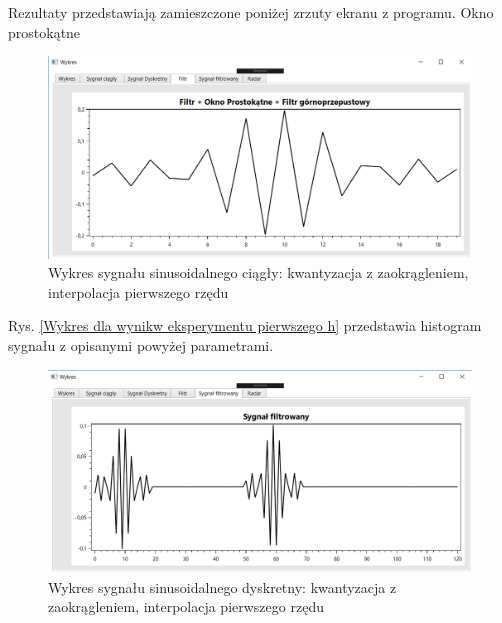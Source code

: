 \documentclass[12pt]{article}
\begin{document}
Rezultaty przedstawiają zamieszczone poniżej zrzuty ekranu z programu. 
\newpage
Okno prostokątne
\begin{figure}[h!]
 \centering
 \includegraphics[width=12.3cm]{prostFGOP.PNG}
 \vspace{-0.3cm}
 \caption{Wykres sygnału sinusoidalnego ciągły: kwantyzacja z zaokrągleniem, interpolacja pierwszego rzędu}
 \label{Wykres dla wyników eksperymentu drugiego}
\end{figure}
\newpage
Rys. \ref{Wykres dla wynikw eksperymentu pierwszego h} przedstawia histogram sygnału z opisanymi powyżej parametrami. 
\begin{figure}[h!]
 \centering
 \includegraphics[width=12.3cm]{prostSFGP.PNG}
 \vspace{-0.3cm}
 \caption{Wykres sygnału sinusoidalnego dyskretny: kwantyzacja z zaokrągleniem, interpolacja pierwszego rzędu}
 \label{Histogram dla wyników eksperymentu drugiego}
\end{figure}
\end{document}
